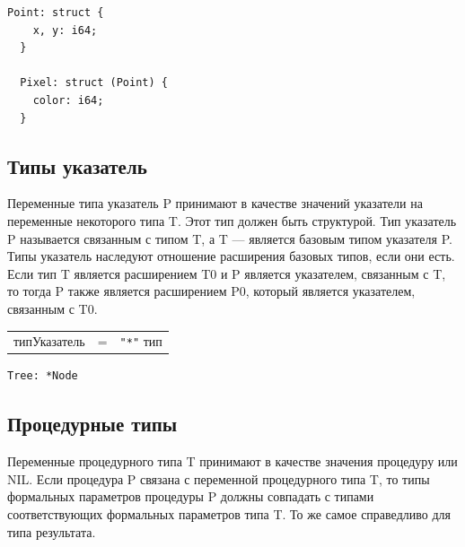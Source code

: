 \documentclass[a4paper,12pt]{article}
\newcommand{\lit}[1]{\texttt{"#1"}}
\begin{document}
    \begin{center}
        \begin{minipage}[t]{0.5\textwidth}
            \begin{lstlisting}[style=obouldstyle]
  Point: struct {
    x, y: i64;
  }

  Pixel: struct (Point) {
    color: i64;
  }
            \end{lstlisting}
        \end{minipage}
    \end{center}


    \subsection*{Типы указатель}

    Переменные типа указатель P принимают в качестве значений указатели на переменные некоторого типа T. Этот тип должен быть структурой. Тип указатель P называется связанным с типом T, а T — является базовым типом указателя P. Типы указатель наследуют отношение расширения базовых типов, если они есть. Если тип T является расширением T0 и P является указателем, связанным с T, то тогда P также является расширением P0, который является указателем, связанным с T0.

    \begin{center}
        \begin{tabular}{l c l}
            типУказатель & = & \lit{*} тип
        \end{tabular}
    \end{center}

    \begin{center}
        \begin{minipage}[t]{0.5\textwidth}
            \begin{lstlisting}[style=obouldstyle]
 Tree: *Node
            \end{lstlisting}
        \end{minipage}
    \end{center}


    \subsection*{Процедурные типы}

    Переменные процедурного типа T принимают в качестве значения процедуру или NIL. Если процедура P связана с переменной процедурного типа T, то типы формальных параметров процедуры P должны совпадать с типами соответствующих формальных параметров типа T. То же самое справедливо для типа результата.
\end{document}
